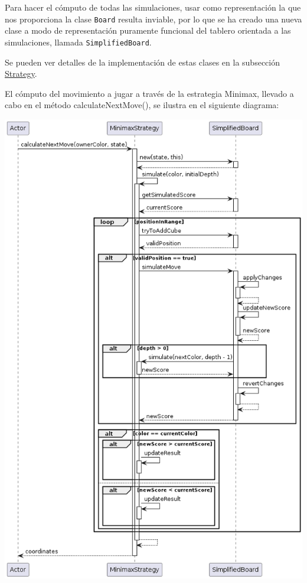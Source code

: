 \documentclass[../DocumentoOficial.tex]{subfiles}
\begin{document}
\begin{sprint}[5]
Para hacer el cómputo de todas las simulaciones, usar como representación la que nos proporciona la clase \texttt{Board} resulta inviable, por lo que se ha creado una nueva clase a modo de representación puramente funcional del tablero orientada a las simulaciones, llamada \texttt{SimplifiedBoard}.

Se pueden ver detalles de la implementación de estas clases en la subsección \hyperref[subsec:Strategy]{Strategy}.

El cómputo del movimiento a jugar a través de la estrategia Minimax, llevado a cabo en el método calculateNextMove(), se ilustra en el siguiente diagrama:

\begin{center}
\centering
\includegraphics[scale=0.45]{MinimaxStrategy.calculateNextMove()-sprint5.png}
\end{center}

\end{sprint}
\end{document}
